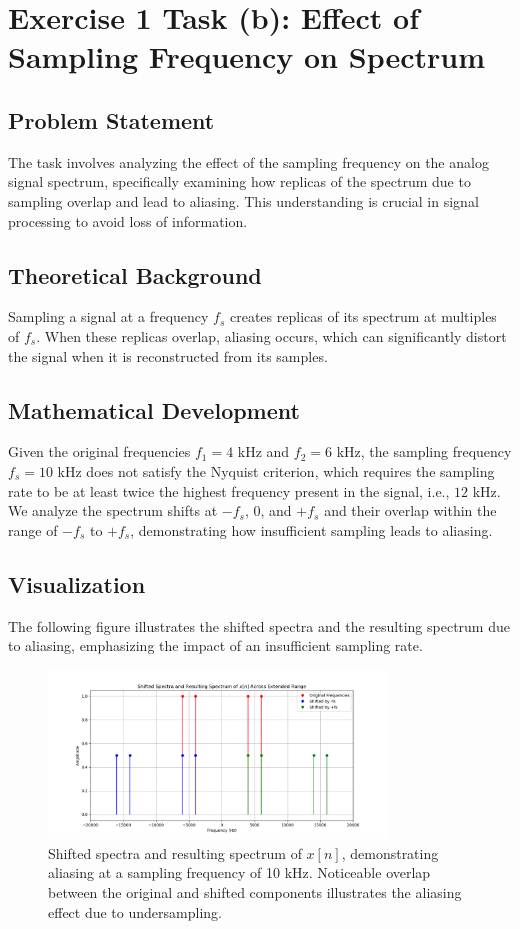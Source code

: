 \item[(b)]
\section*{Exercise 1 Task (b): Effect of Sampling Frequency on Spectrum}

\subsection*{Problem Statement}
The task involves analyzing the effect of the sampling frequency on the analog signal spectrum, specifically examining how replicas of the spectrum due to sampling overlap and lead to aliasing. This understanding is crucial in signal processing to avoid loss of information.

\subsection*{Theoretical Background}
Sampling a signal at a frequency $f_s$ creates replicas of its spectrum at multiples of $f_s$. When these replicas overlap, aliasing occurs, which can significantly distort the signal when it is reconstructed from its samples.

\subsection*{Mathematical Development}
Given the original frequencies $f_1 = 4$ kHz and $f_2 = 6$ kHz, the sampling frequency $f_s = 10$ kHz does not satisfy the Nyquist criterion, which requires the sampling rate to be at least twice the highest frequency present in the signal, i.e., $12$ kHz. We analyze the spectrum shifts at $-f_s$, $0$, and $+f_s$ and their overlap within the range of $-f_s$ to $+f_s$, demonstrating how insufficient sampling leads to aliasing.

\subsection*{Visualization}
The following figure illustrates the shifted spectra and the resulting spectrum due to aliasing, emphasizing the impact of an insufficient sampling rate.

\begin{figure}[h]
    \centering
    \includegraphics[width=0.8\textwidth]{fig/ex1_b_plot.png}
    \caption{Shifted spectra and resulting spectrum of $x[n]$, demonstrating aliasing at a sampling frequency of 10 kHz. Noticeable overlap between the original and shifted components illustrates the aliasing effect due to undersampling.}
    \label{fig:ex1b_spectrum}
\end{figure}

